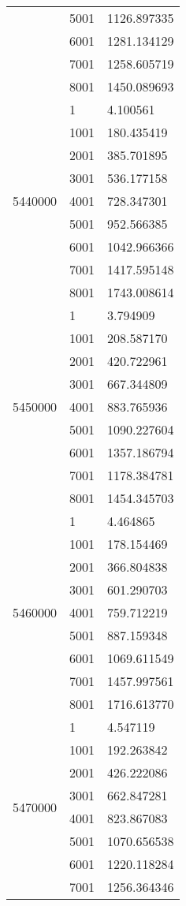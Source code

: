 \begin{table}[htb!]
\begin{tabular}{lll}
 & 5001 & 1126.897335 \\
 & 6001 & 1281.134129 \\
 & 7001 & 1258.605719 \\
 & 8001 & 1450.089693 \\
\multirow[c]{9}{*}{5440000} & 1 & 4.100561 \\
 & 1001 & 180.435419 \\
 & 2001 & 385.701895 \\
 & 3001 & 536.177158 \\
 & 4001 & 728.347301 \\
 & 5001 & 952.566385 \\
 & 6001 & 1042.966366 \\
 & 7001 & 1417.595148 \\
 & 8001 & 1743.008614 \\
\multirow[c]{9}{*}{5450000} & 1 & 3.794909 \\
 & 1001 & 208.587170 \\
 & 2001 & 420.722961 \\
 & 3001 & 667.344809 \\
 & 4001 & 883.765936 \\
 & 5001 & 1090.227604 \\
 & 6001 & 1357.186794 \\
 & 7001 & 1178.384781 \\
 & 8001 & 1454.345703 \\
\multirow[c]{9}{*}{5460000} & 1 & 4.464865 \\
 & 1001 & 178.154469 \\
 & 2001 & 366.804838 \\
 & 3001 & 601.290703 \\
 & 4001 & 759.712219 \\
 & 5001 & 887.159348 \\
 & 6001 & 1069.611549 \\
 & 7001 & 1457.997561 \\
 & 8001 & 1716.613770 \\
\multirow[c]{9}{*}{5470000} & 1 & 4.547119 \\
 & 1001 & 192.263842 \\
 & 2001 & 426.222086 \\
 & 3001 & 662.847281 \\
 & 4001 & 823.867083 \\
 & 5001 & 1070.656538 \\
 & 6001 & 1220.118284 \\
 & 7001 & 1256.364346 \\

\end{tabular}
\end{table}
